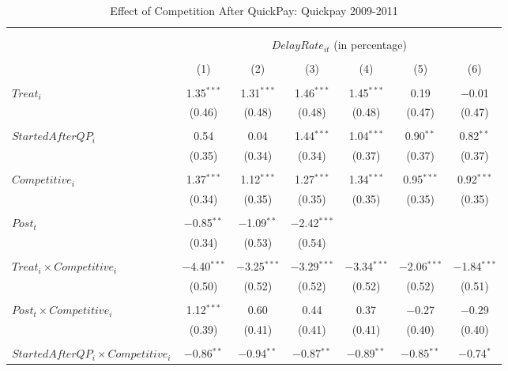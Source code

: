 \documentclass[
]{article}
\begin{document}
\begin{table}[H] \centering 
  \caption{Effect of Competition After QuickPay: Quickpay 2009-2011} 
  \label{} 
\small 
\begin{tabular}{@{\extracolsep{-3pt}}lcccccc} 
\\[-1.8ex]\hline 
\hline \\[-1.8ex] 
\\[-1.8ex] & \multicolumn{6}{c}{$DelayRate_{it}$ (in percentage)} \\ 
\\[-1.8ex] & (1) & (2) & (3) & (4) & (5) & (6)\\ 
\hline \\[-1.8ex] 
 $Treat_i$ & 1.35$^{***}$ & 1.31$^{***}$ & 1.46$^{***}$ & 1.45$^{***}$ & 0.19 & $-$0.01 \\ 
  & (0.46) & (0.48) & (0.48) & (0.48) & (0.47) & (0.47) \\ 
  & & & & & & \\ 
 $StartedAfterQP_i$ & 0.54 & 0.04 & 1.44$^{***}$ & 1.04$^{***}$ & 0.90$^{**}$ & 0.82$^{**}$ \\ 
  & (0.35) & (0.34) & (0.34) & (0.37) & (0.37) & (0.37) \\ 
  & & & & & & \\ 
 $Competitive_i$ & 1.37$^{***}$ & 1.12$^{***}$ & 1.27$^{***}$ & 1.34$^{***}$ & 0.95$^{***}$ & 0.92$^{***}$ \\ 
  & (0.34) & (0.35) & (0.35) & (0.35) & (0.35) & (0.35) \\ 
  & & & & & & \\ 
 $Post_t$ & $-$0.85$^{**}$ & $-$1.09$^{**}$ & $-$2.42$^{***}$ &  &  &  \\ 
  & (0.34) & (0.53) & (0.54) &  &  &  \\ 
  & & & & & & \\ 
 $Treat_i \times Competitive_i$ & $-$4.40$^{***}$ & $-$3.25$^{***}$ & $-$3.29$^{***}$ & $-$3.34$^{***}$ & $-$2.06$^{***}$ & $-$1.84$^{***}$ \\ 
  & (0.50) & (0.52) & (0.52) & (0.52) & (0.52) & (0.51) \\ 
  & & & & & & \\ 
 $Post_t \times Competitive_i$ & 1.12$^{***}$ & 0.60 & 0.44 & 0.37 & $-$0.27 & $-$0.29 \\ 
  & (0.39) & (0.41) & (0.41) & (0.41) & (0.40) & (0.40) \\ 
  & & & & & & \\ 
 $StartedAfterQP_i \times Competitive_i$ & $-$0.86$^{**}$ & $-$0.94$^{**}$ & $-$0.87$^{**}$ & $-$0.89$^{**}$ & $-$0.85$^{**}$ & $-$0.74$^{*}$ \\ 

\end{tabular}
\end{table}
\end{document}
